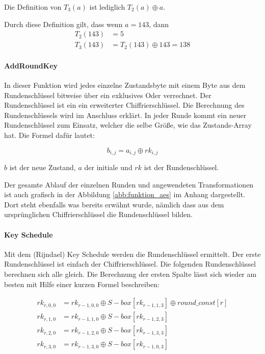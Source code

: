     Die Definition von $T_3(a)$ ist lediglich $T_2(a) \oplus a$.
    
    Durch diese Definition gilt, dass wenn $a = 143$, dann
    \begin{equation*}
     \begin{aligned}
     T_2(143) &= 5 \\
     T_3(143) &= T_2(143) \oplus 143 = 138
     \end{aligned}
    \end{equation*}
   
  \paragraph{AddRoundKey}
   In dieser Funktion wird jedes einzelne Zustandsbyte mit einem Byte aus dem Rundenschlüssel bitweise über
   ein exklusives Oder verrechnet. Der Rundenschlüssel ist ein ein erweiterter Chiffrierschlüssel. Die Berechnung
   des Rundenschlüssels wird im Anschluss erklärt. In jeder Runde kommt ein neuer Rundenschlüssel zum
   Einsatz, welcher die selbe Größe, wie das Zustands-Array hat. Die Formel dafür lautet:
   
   \begin{equation*}
    b_{i,j} = a_{i,j} \oplus rk_{i,j}
   \end{equation*}
   
   $b$ ist der neue Zustand, $a$ der initiale und $rk$ ist der Rundenschlüssel.
   
   Der gesamte Ablauf der einzelnen Runden und angewendeten Transformationen ist auch grafisch in der
   Abbildung \ref{abb:funktion_aes} im Anhang dargestellt. Dort steht ebenfalls was bereits erwähnt wurde,
   nämlich dass aus dem ursprünglichen Chiffrierschlüssel die Rundenschlüssel bilden.
   
  \paragraph{Key Schedule}
   Mit dem (Rijndael) Key Schedule werden die Rundenschlüssel ermittelt. Der erste Rundenschlüssel ist
   einfach der Chiffrierschlüssel. Die folgenden Rundenschlüssel berechnen sich alle gleich. Die Berechnung der
   ersten Spalte lässt sich wieder am besten mit Hilfe einer kurzen Formel beschreiben:
   
    \begin{equation*}
     \begin{aligned}
     rk_{r,0,0} &= rk_{r-1,0,0} \oplus S-box[rk_{r-1,1,3}] \oplus round\_const[r] \\
     rk_{r,1,0} &= rk_{r-1,1,0} \oplus S-box[rk_{r-1,2,3}] \\
     rk_{r,2,0} &= rk_{r-1,2,0} \oplus S-box[rk_{r-1,3,3}] \\
     rk_{r,3,0} &= rk_{r-1,3,0} \oplus S-box[rk_{r-1,0,3}]
     \end{aligned}
    \end{equation*}
    
